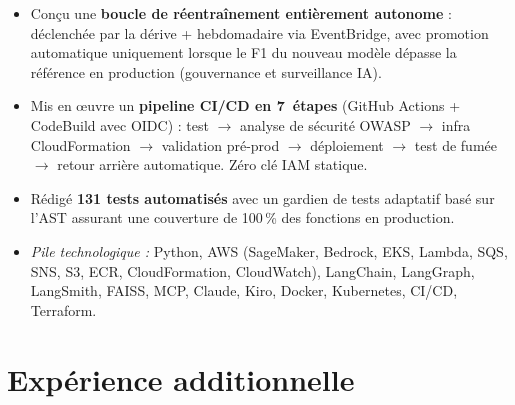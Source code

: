 \documentclass[10pt,a4paper,sans]{moderncv}
\begin{document}
{\begin{itemize}[leftmargin=1.2em, topsep=1pt, itemsep=0pt, parsep=0pt]
        $\rightarrow$ SQS $\rightarrow$ worker K8s $\rightarrow$ S3
        $\rightarrow$ alertes SNS) pour la haute disponibilité.
  \item Conçu une \textbf{boucle de réentraînement entièrement autonome} :
        déclenchée par la dérive + hebdomadaire via EventBridge, avec
        promotion automatique uniquement lorsque le F1 du nouveau modèle
        dépasse la référence en production (gouvernance et surveillance IA).
  \item Mis en \oe{}uvre un \textbf{pipeline CI/CD en 7~étapes} (GitHub Actions +
        CodeBuild avec OIDC) : test $\rightarrow$ analyse de sécurité OWASP
        $\rightarrow$ infra CloudFormation $\rightarrow$ validation pré-prod
        $\rightarrow$ déploiement $\rightarrow$ test de fumée $\rightarrow$
        retour arrière automatique. Zéro clé IAM statique.
  \item Rédigé \textbf{131 tests automatisés} avec un gardien de tests adaptatif
        basé sur l'AST assurant une couverture de 100\,\% des fonctions
        en production.
  \item \textit{Pile technologique :} Python, AWS (SageMaker, Bedrock, EKS,
        Lambda, SQS, SNS, S3, ECR, CloudFormation, CloudWatch), LangChain,
        LangGraph, LangSmith, FAISS, MCP, Claude, Kiro, Docker, Kubernetes,
        CI/CD, Terraform.
\end{itemize}}


\section{Expérience additionnelle}
\end{document}
